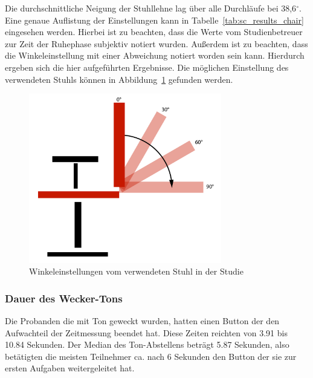 Die durchschnittliche Neigung der Stuhllehne lag über alle Durchläufe bei 38,6$^\circ$. Eine genaue Auflistung der Einstellungen kann in Tabelle~\ref{tab:sc_results_chair} eingesehen werden. Hierbei ist zu beachten, dass die Werte vom Studienbetreuer zur Zeit der Ruhephase subjektiv notiert wurden. Außerdem ist zu beachten, dass die Winkeleinstellung mit einer Abweichung notiert worden sein kann. Hierdurch ergeben sich die hier aufgeführten Ergebnisse. Die möglichen Einstellung des verwendeten Stuhls können in Abbildung~\ref{fig:chair_backrest} gefunden werden.

\begin{figure}[H]
	\centering
	\includegraphics[width=0.75\textwidth]{./images/chair}
	\caption{Winkeleinstellungen vom verwendeten Stuhl in der Studie}
	\label{fig:chair_backrest}
\end{figure}


\subsubsection{Dauer des Wecker-Tons}

Die Probanden die mit Ton geweckt wurden, hatten einen Button der den Aufwachteil der Zeitmessung beendet hat. Diese Zeiten reichten von 3.91 bis 10.84 Sekunden. Der Median des Ton-Abstellens beträgt 5.87 Sekunden, also betätigten die meisten Teilnehmer ca. nach 6 Sekunden den Button der sie zur ersten Aufgaben weitergeleitet hat. 


